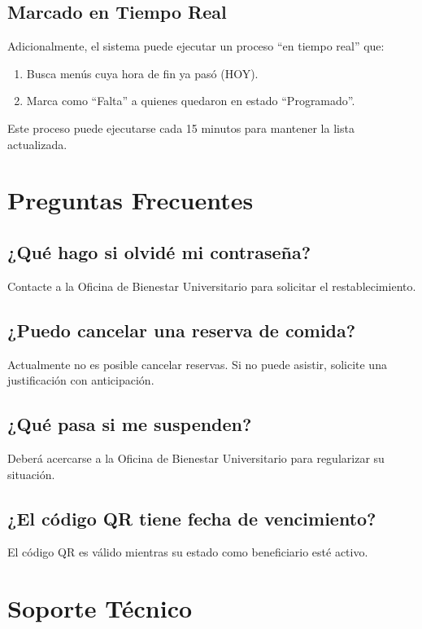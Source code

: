 \documentclass[12pt,a4paper]{article}
\begin{document}
\subsection{Marcado en Tiempo Real}
Adicionalmente, el sistema puede ejecutar un proceso ``en tiempo real'' que:

\begin{enumerate}
    \item Busca menús cuya hora de fin ya pasó (HOY).
    \item Marca como ``Falta'' a quienes quedaron en estado ``Programado''.
\end{enumerate}

Este proceso puede ejecutarse cada 15 minutos para mantener la lista actualizada.

\section{Preguntas Frecuentes}

\subsection{¿Qué hago si olvidé mi contraseña?}
Contacte a la Oficina de Bienestar Universitario para solicitar el restablecimiento.

\subsection{¿Puedo cancelar una reserva de comida?}
Actualmente no es posible cancelar reservas. Si no puede asistir, solicite una justificación con anticipación.

\subsection{¿Qué pasa si me suspenden?}
Deberá acercarse a la Oficina de Bienestar Universitario para regularizar su situación.

\subsection{¿El código QR tiene fecha de vencimiento?}
El código QR es válido mientras su estado como beneficiario esté activo.

\section{Soporte Técnico}
\end{document}
